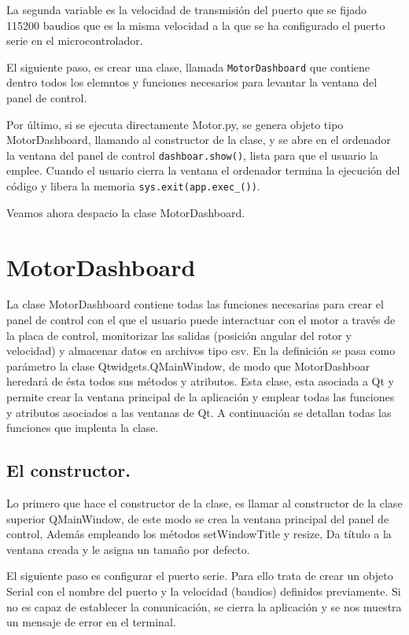 La segunda variable es la velocidad de transmisión del puerto que se fijado 115200 baudios que es la misma velocidad a la que se ha configurado el puerto serie en el microcontrolador.

El siguiente paso, es crear una clase, llamada \texttt{MotorDashboard} que contiene dentro todos los elemntos y funciones necesarios para levantar la ventana del panel de control.

Por último, si se ejecuta directamente Motor.py, se genera objeto tipo MotorDashboard, llamando al constructor de la clase, y se abre en el ordenador la ventana del panel de control \texttt{dashboar.show()}, lista para que el usuario la emplee. Cuando el usuario cierra la ventana el ordenador termina la ejecución del código y libera la memoria \texttt{sys.exit(app.exec\_())}.

Veamos ahora despacio la clase MotorDashboard.

\section{MotorDashboard}
La clase MotorDashboard contiene todas las funciones necesarias para crear el panel de control con el que el usuario puede interactuar con el motor a través de la placa de control, monitorizar las salidas (posición angular del rotor y velocidad) y almacenar datos en archivos tipo csv.
En la definición se pasa como parámetro la clase Qtwidgets.QMainWindow, de modo que MotorDashboar heredará de ésta todos sus métodos y atributos. Esta clase, esta asociada a Qt y permite crear la ventana principal de la aplicación y emplear todas las funciones y atributos asociados a las ventanas de Qt. A continuación se detallan todas las funciones que implenta la clase.

\subsection{El constructor.} Lo primero que hace el constructor de la clase, es llamar al constructor de la clase superior QMainWindow, de este modo se crea la ventana principal del panel de control, Además empleando los métodos setWindowTitle y resize, Da título a la ventana creada y le asigna un tamaño por defecto.

El siguiente paso es configurar el puerto serie. Para ello trata de crear un objeto Serial con el nombre del puerto y la velocidad (baudios) definidos previamente. Si no es capaz de establecer la comunicación, se cierra la aplicación y se nos muestra un mensaje de error en el terminal.

